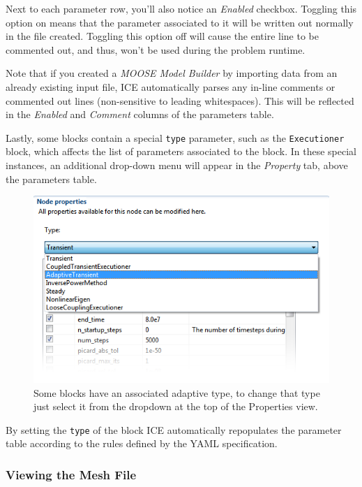 Next to each parameter row, you'll also notice an \emph{Enabled}
checkbox. Toggling this option on means that the parameter associated to
it will be written out normally in the file created. Toggling this
option off will cause the entire line to be commented out, and thus,
won't be used during the problem runtime.

Note that if you created a \emph{MOOSE Model Builder} by importing data
from an already existing input file, ICE automatically parses any
in-line comments or commented out lines (non-sensitive to leading
whitespaces). This will be reflected in the \emph{Enabled} and
\emph{Comment} columns of the parameters table.

Lastly, some blocks contain a special \texttt{type} parameter, such as
the \texttt{Executioner} block, which affects the list of parameters
associated to the block. In these special instances, an additional
drop-down menu will appear in the \emph{Property} tab, above the
parameters table.

\begin{figure}[htbp]
\centering
\includegraphics[width=\textwidth]{figures/ICE_MOOSEAdaptiveType.png}
\caption{Some blocks have an associated adaptive type, to change that type just select it from the dropdown at the top of the Properties view.}
\end{figure}

By setting the \texttt{type} of the block ICE automatically repopulates
the parameter table according to the rules defined by the YAML
specification.

\subsubsection{Viewing the Mesh File}\label{viewing-the-mesh-file}


